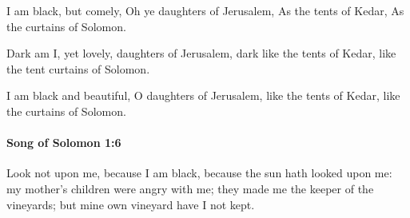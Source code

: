			\begin{versebox}
					\item[BHS] 
					\item[LXX] 
					\item[ASV] I am black, but comely, Oh ye daughters of Jerusalem, As the tents of Kedar, As the curtains of Solomon.
					\item[NIV] Dark am I, yet lovely, daughters of Jerusalem, dark like the tents of Kedar, like the tent curtains of Solomon.
					\item[NRSV] I am black and beautiful, O daughters of Jerusalem, like the tents of Kedar, like the curtains of Solomon.
			\end{versebox}

		\paragraph{Song of Solomon 1:6} %
			\label{SONGOFSOLOMON-1-6}

			Look not upon me, because I am black, because the sun hath looked upon me: my mother’s children were angry with me; they made me the keeper of the vineyards; but mine own vineyard have I not kept.

